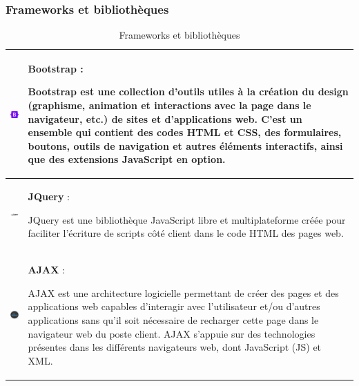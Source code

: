 \documentclass{article}
\begin{document}
                \subsubsection{Frameworks et bibliothèques}
                    \begin{table}[h!]
                        \centering
                        \begin{tabular}{|m{2cm}|m{12cm}|}
                            \hline
                            \includegraphics[width=2cm]{assets/logos/OIP (1).jpg} &
                            \textbf{Bootstrap} :
                            
                            Bootstrap est une collection d'outils utiles à la création du design (graphisme, animation et interactions avec la page dans le navigateur, etc.) de sites et d'applications web. C'est un ensemble qui contient des codes HTML et CSS, des formulaires, boutons, outils de navigation et autres éléments interactifs, ainsi que des extensions JavaScript en option. \\
                            \hline
                            \includegraphics[width=2cm]{assets/logos/jq.png} &
                            \textbf{JQuery} :
                            
                            JQuery est une bibliothèque JavaScript libre et multiplateforme créée pour faciliter l'écriture de scripts côté client dans le code HTML des pages web. \\
                            \hline
                            \includegraphics[width=2cm]{assets/logos/ajax.png} &
                            \textbf{AJAX} :
                            
                            AJAX est une architecture logicielle permettant de créer des pages et des applications web capables d'interagir avec l'utilisateur et/ou d'autres applications sans qu'il soit nécessaire de recharger cette page dans le navigateur web du poste client. AJAX s'appuie sur des technologies présentes dans les différents navigateurs web, dont JavaScript (JS) et XML. \\
                            \hline
                        \end{tabular}
                        \caption{Frameworks et bibliothèques}
                    \end{table}
                \FloatBarrier
\end{document}
